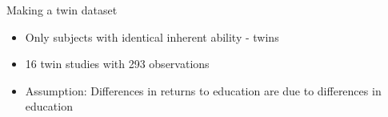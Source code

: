 \documentclass{beamer} %
\begin{document}
\begin{frame}{Making a twin dataset}

    \begin{itemize}
        \item Only subjects with identical inherent ability - twins
        \item 16 twin studies with 293 observations
        \item Assumption: Differences in returns to education are due to differences in education
    \end{itemize}

\end{frame}



\end{document}
